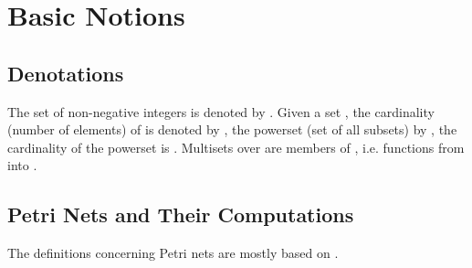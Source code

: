 \documentclass[a4paper]{llncs}
\begin{document}
\section{Basic Notions}

\subsection{Denotations}
The set of non-negative integers is denoted by . Given a set , the cardinality (number of elements) of  is denoted by , the powerset (set of all subsets) by , the cardinality of the powerset is . Multisets over  are members of  , i.e. functions from  into .

\subsection{Petri Nets and Their Computations}

The definitions concerning Petri nets are mostly based on \cite{DeselReisig}.
\end{document}
